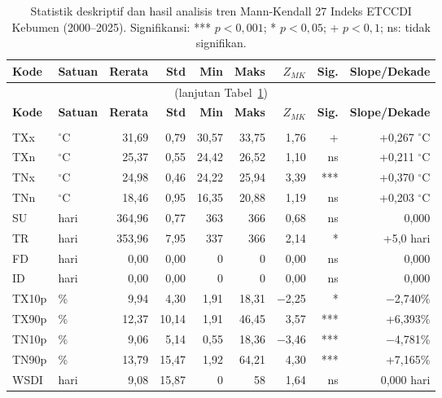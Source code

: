 \documentclass[12pt, a4paper]{article}
\newcommand{\degC}{$^{\circ}$C}
\begin{document}
\scriptsize
\setlength{\tabcolsep}{3pt}
\begin{longtable}[c]{@{}llrrrrrrr@{}}
  \caption{Statistik deskriptif dan hasil analisis tren Mann-Kendall 27 Indeks ETCCDI Kebumen (2000--2025). Signifikansi: *** $p<0{,}001$; * $p<0{,}05$; + $p<0{,}1$; ns: tidak signifikan.}\label{tab:etccdi_summary}\\
  \toprule
  \textbf{Kode} & \textbf{Satuan} & \textbf{Rerata} & \textbf{Std} & \textbf{Min} & \textbf{Maks} & \textbf{$Z_{MK}$} & \textbf{Sig.} & \textbf{Slope/Dekade} \\
  \midrule
  \endfirsthead
  \multicolumn{9}{c}{\footnotesize(lanjutan Tabel~\ref{tab:etccdi_summary})}\\
  \toprule
  \textbf{Kode} & \textbf{Satuan} & \textbf{Rerata} & \textbf{Std} & \textbf{Min} & \textbf{Maks} & \textbf{$Z_{MK}$} & \textbf{Sig.} & \textbf{Slope/Dekade} \\
  \midrule
  \endhead
  \bottomrule
  \endfoot
  \multicolumn{9}{@{}l}{\cellcolor{headerblue!15}\textbf{I. Indeks Suhu Udara Ekstrem}} \\
  TXx  & \degC    & 31,69 & 0,79  & 30,57 & 33,75 & 1,76  & +   & +0,267 \degC \\
  TXn  & \degC    & 25,37 & 0,55  & 24,42 & 26,52 & 1,10  & ns  & +0,211 \degC \\
  TNx  & \degC    & 24,98 & 0,46  & 24,22 & 25,94 & 3,39  & *** & +0,370 \degC \\
  TNn  & \degC    & 18,46 & 0,95  & 16,35 & 20,88 & 1,19  & ns  & +0,203 \degC \\
  SU   & hari    & 364,96 & 0,77  & 363   & 366   & 0,68  & ns  & 0,000 \\
  TR   & hari    & 353,96 & 7,95  & 337   & 366   & 2,14  & *   & +5,0 hari \\
  FD   & hari    & 0,00  & 0,00  & 0     & 0     & 0,00  & ns  & 0,000 \\
  ID   & hari    & 0,00  & 0,00  & 0     & 0     & 0,00  & ns  & 0,000 \\
  TX10p & \%     & 9,94  & 4,30  & 1,91  & 18,31 & $-$2,25 & * & $-$2,740\% \\
  TX90p & \%     & 12,37 & 10,14 & 1,91  & 46,45 & 3,57  & *** & +6,393\% \\
  TN10p & \%     & 9,06  & 5,14  & 0,55  & 18,36 & $-$3,46 & *** & $-$4,781\% \\
  TN90p & \%     & 13,79 & 15,47 & 1,92  & 64,21 & 4,30  & *** & +7,165\% \\
  WSDI & hari    & 9,08  & 15,87 & 0     & 58    & 1,64  & ns  & 0,000 hari \\

\end{longtable}
\end{document}
